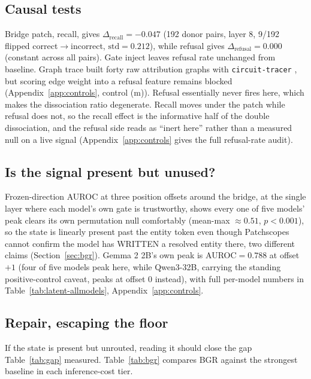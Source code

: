 \documentclass{article}
\begin{document}
\subsection{Causal tests}
\label{sec:res-causal}
\vspace{-0.3em}

Bridge patch, recall, gives $\Delta_{\mathrm{recall}}=-0.047$ (192 donor pairs, layer 8, 9/192 flipped
correct$\to$incorrect, $\mathrm{std}=0.212$), while refusal gives $\Delta_{\mathrm{refusal}}=0.000$
(constant across all pairs). Gate inject leaves refusal rate unchanged from baseline. Graph trace
built forty raw attribution graphs with \texttt{circuit-tracer} \citep{hanna2025circuittracer}, but
scoring edge weight into a refusal feature remains blocked (Appendix~\ref{app:controls}, control (m)).
Refusal essentially never fires here, which makes the dissociation ratio degenerate. Recall moves
under the patch while refusal does not, so the recall effect is the informative half of the double
dissociation, and the refusal side reads as ``inert here'' rather than a measured null on a live
signal (Appendix~\ref{app:controls} gives the full refusal-rate audit).
\label{sec:res-e2-refusal}

\subsection{Is the signal present but unused?}
\label{sec:res-latent}

Frozen-direction AUROC at three position offsets around the bridge, at the single layer where each
model's own gate is trustworthy, shows every one of five models' peak clears its own permutation null
comfortably (mean-max $\approx0.51$, $p<0.001$), so the state is linearly present past the entity
token even though Patchscopes cannot confirm the model has WRITTEN a resolved entity there, two
different claims (Section~\ref{sec:bgr}). Gemma 2 2B's own peak is AUROC$=0.788$ at offset $+1$ (four
of five models peak here, while Qwen3-32B, carrying the standing positive-control caveat, peaks at
offset $0$ instead), with full per-model numbers in Table~\ref{tab:latent-allmodels},
Appendix~\ref{app:controls}.

\subsection{Repair, escaping the floor}

If the state is present but unrouted, reading it should close the gap Table~\ref{tab:gap} measured.
Table~\ref{tab:bgr} compares BGR against the strongest baseline in each inference-cost tier.
\end{document}

